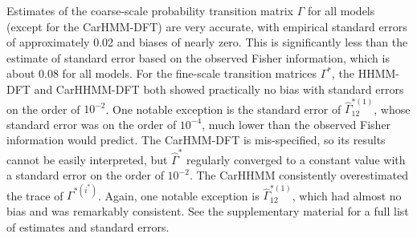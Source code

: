 Estimates of the coarse-scale probability transition matrix $\Gamma$ for all models (except for the CarHMM-DFT) are very accurate, with empirical standard errors of approximately 0.02 and biases of nearly zero. This is significantly less than the estimate of standard error based on the observed Fisher information, which is about 0.08 for all models.
For the fine-scale transition matrices $\Gamma^*$, the HHMM-DFT and CarHHMM-DFT both showed practically no bias with standard errors on the order of $10^{-2}$. One notable exception is the standard error of $\hat \Gamma^{*(1)}_{12}$, whose standard error was on the order of $10^{-4}$, much lower than the observed Fisher information would predict. The CarHMM-DFT is mis-specified, so its results cannot be easily interpreted, but $\hat \Gamma^*$ regularly converged to a constant value with a standard error on the order of $10^{-2}$. The CarHHMM consistently overestimated the trace of $\Gamma^{*(i^*)}$. Again, one notable exception is $\hat \Gamma^{*(1)}_{12}$, which had almost no bias and was remarkably consistent. See the supplementary material for a full list of estimates and standard errors.